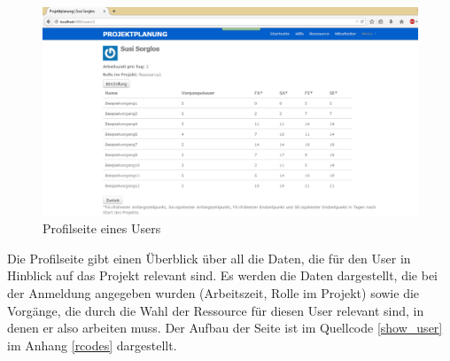\documentclass[a4paper,12pt,parskip,bibtotoc,liststotoc]{article}
\begin{document}
\begin{figure}[h!]
  \begin{center}
    \includegraphics[width=120mm]{Bilder/Profilseite.png}
    \caption{Profilseite eines Users}  \label{Profil}
  \end{center}
\end{figure}

Die Profilseite gibt einen Überblick über all die Daten, die für den User in Hinblick auf das Projekt relevant sind. Es werden die Daten dargestellt, die bei der Anmeldung angegeben wurden (Arbeitszeit, Rolle im Projekt) sowie die Vorgänge, die durch die Wahl der Ressource für diesen User relevant sind, in denen er also arbeiten muss. Der Aufbau der Seite ist im Quellcode \ref{show_user} im Anhang \ref{rcodes} dargestellt.\\
\end{document}
